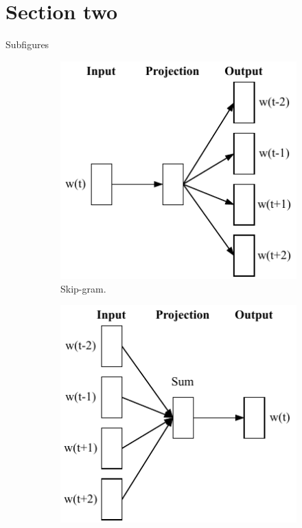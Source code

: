\documentclass{beamer}
\begin{document}
\section{Section two}
    \begin{frame}{Subfigures}
        \begin{figure}
            \centering
            \begin{subfigure}{0.4\textwidth}
                \includegraphics[width=\textwidth]{pic/skip_gram.pdf}
                \caption{Skip-gram.}
                \label{fig:first}
            \end{subfigure}
            \hfill
            \begin{subfigure}{0.4\textwidth}
                \includegraphics[width=\textwidth]{pic/cbow.pdf}

\end{subfigure}
\end{figure}
\end{frame}
\end{document}
